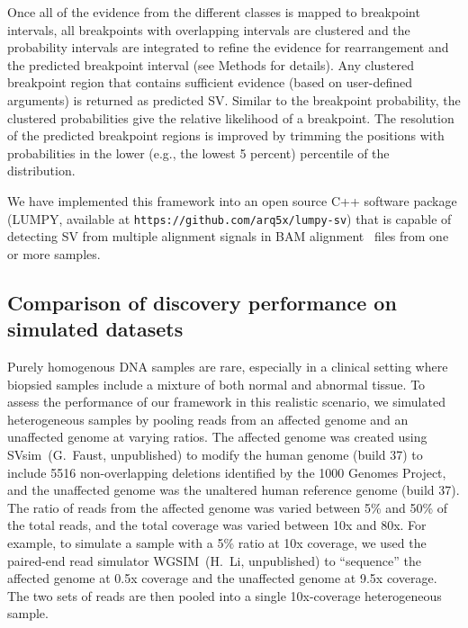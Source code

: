 \documentclass[10pt]{bmc_article}
\newenvironment{bmcformat}{\begin{raggedright}\baselineskip20pt\sloppy\setboolean{publ}{false}}{\end{raggedright}\baselineskip20pt\sloppy}
\begin{document}
\begin{bmcformat}
Once all of the evidence from the different classes is mapped to breakpoint
intervals, all breakpoints with overlapping intervals are clustered and
the probability intervals are integrated to refine the evidence for
rearrangement and the predicted breakpoint interval (see Methods for details). 
Any clustered breakpoint region that contains sufficient evidence (based on
user-defined arguments) is returned as predicted SV. 
Similar to the breakpoint probability, the clustered probabilities give the
relative likelihood of a breakpoint.  The resolution of the predicted breakpoint
regions is improved by trimming the positions with probabilities
in the lower (e.g., the lowest 5 percent) percentile of the distribution.

We have implemented this framework into an open source C++ software package
(LUMPY, available at {\tt https://github.com/arq5x/lumpy-sv})
that is capable of detecting SV from multiple alignment signals in BAM
alignment~\cite{li2009b} files from one or more samples. 


\subsection*{Comparison of discovery performance on simulated datasets}
Purely homogenous DNA samples are rare, especially in a clinical setting where
biopsied samples include a mixture of both normal and abnormal tissue.  To
assess the performance of our framework in this realistic scenario, we simulated
heterogeneous samples by pooling reads from an affected genome and an unaffected
genome at varying ratios.  The affected genome was created using
SVsim~(G.~Faust, unpublished) to modify the human genome (build 37) to include
5516 non-overlapping deletions identified by the 1000 Genomes Project, and the
unaffected genome was the unaltered human reference genome (build 37).  The
ratio of reads from the affected genome was varied between 5\% and 50\% of the
total reads, and the total coverage was varied between 10x and 80x.  For
example, to simulate a sample with a 5\% ratio at 10x coverage, we used the
paired-end read simulator WGSIM~(H.~Li, unpublished) to “sequence” the affected
genome at 0.5x coverage and the unaffected genome at 9.5x coverage.  The two
sets of reads are then pooled into a single 10x-coverage heterogeneous sample.


\end{bmcformat}
\end{document}
